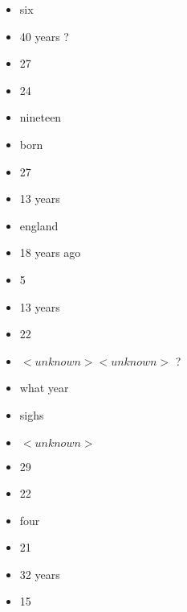 \begin{multicols}{2}
\begin{itemize}
		\item six
		\item 40 years ?
		\item 27
		\item 24
		\item nineteen
		\item born
		\item 27
		\item 13 years
		\item england
		\item 18 years ago
		\item 5
		\item 13 years
		\item 22
		\item $<unknown> <unknown>$ ?
		\item what year
		\item sighs
		\item $<unknown>$
		\item 29
		\item 22
		\item four
		\item 21
		\item 32 years
		\item 15
	\end{itemize}
\end{multicols}

